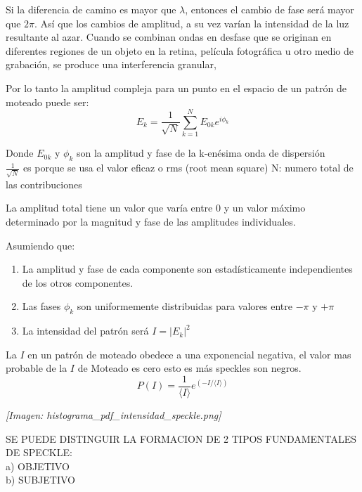 \documentclass[12pt]{article}
\begin{document}
	\vspace{0.5cm}
	Si la diferencia de camino es mayor que $\lambda$, entonces el cambio de fase será mayor que $2\pi$. Así que los cambios de amplitud, a su vez varían la intensidad de la luz resultante al azar. Cuando se combinan ondas en desfase que se originan en diferentes regiones de un objeto en la retina, película fotográfica u otro medio de grabación, se produce una interferencia granular,
	
	Por lo tanto la amplitud compleja para un punto en el espacio de un patrón de moteado puede ser:
	\begin{equation*}
		E_k = \frac{1}{\sqrt{N}} \sum_{k=1}^N E_{0k} e^{i\phi_k}
	\end{equation*}
	
	Donde $E_{0k}$ y $\phi_k$ son la amplitud y fase de la k-enésima onda de dispersión \\
	$\frac{1}{\sqrt{N}}$ es porque se usa el valor eficaz o rms (root mean square) N: numero total de las contribuciones
	
	La amplitud total tiene un valor que varía entre 0 y un valor máximo determinado por la magnitud y fase de las amplitudes individuales.
	
	\begin{minipage}{0.45\textwidth}
		Asumiendo que:
		\begin{enumerate}
			\item La amplitud y fase de cada componente son estadísticamente independientes de los otros componentes.
			\item Las fases $\phi_k$ son uniformemente distribuidas para valores entre $-\pi$ y $+\pi$
			\item La intensidad del patrón será $I = |E_k|^2$
		\end{enumerate}
		La $I$ en un patrón de moteado obedece a una exponencial negativa, el valor mas probable de la $I$ de Moteado es cero esto es más speckles son negros.
		\begin{equation*}
			P(I) = \frac{1}{\langle I \rangle} e^{\left(-I / \langle I \rangle\right)}
		\end{equation*}
	\end{minipage}
	\hfill
	\begin{minipage}{0.5\textwidth}
		\textit{[Imagen: histograma\_pdf\_intensidad\_speckle.png]}
	\end{minipage}
	
	\colorbox{cyan!10}{\parbox{\textwidth}{
			SE PUEDE DISTINGUIR LA FORMACION DE 2 TIPOS FUNDAMENTALES DE SPECKLE: \\
			a) OBJETIVO \\
			b) SUBJETIVO
	}}
	
\end{document}
